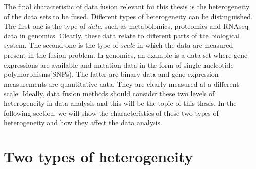 The final characteristic of data fusion relevant for this thesis is the heterogeneity of the data sets to be fused. Different types of heterogeneity can be distinguished. The first one is the type of \emph{data}, such as metabolomics, proteomics and RNAseq data in genomics. Clearly, these data relate to different parts of the biological system. The second one is the type of \emph{scale} in which the data are measured present in the fusion problem. In genomics, an example is a data set where gene-expressions are available and mutation data in the form of single nucleotide polymorphisms(SNPs). The latter are binary data and gene-expression measurements are quantitative data. They are clearly measured at a different scale. Ideally, data fusion methods should consider these two levels of heterogeneity in data analysis and this will be the topic of this thesis. In the following section, we will show the characteristics of these two types of heterogeneity and how they affect the data analysis.

\section{Two types of heterogeneity}

